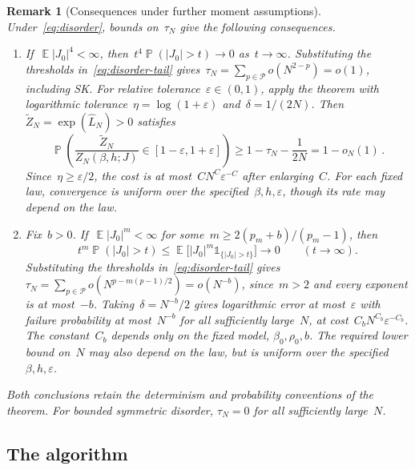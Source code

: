 \documentclass[letterpaper,11pt,reqno]{amsart}
\newenvironment{enumeratei}{\begin{enumerate}[\upshape (i)]}{\end{enumerate}}
\renewcommand{\leq}{\leqslant}
\renewcommand{\geq}{\geqslant}
\newcommand{\ind}{\mathds{1}}
\DeclareMathOperator{\E}{\mathds{E}}
\DeclareMathOperator{\pr}{\mathds{P}}
\newtheorem{remark}[theorem]{Remark}
\begin{document}
\begin{remark}[Consequences under further moment assumptions]\label{rem:moment-consequences}\label{thm:relative-counting}\label{cor:polynomial-confidence}
Under~\eqref{eq:disorder}, bounds on~$\tau_N$ give the following consequences.
\begin{enumeratei}
\item If~$\E|J_0|^4<\infty$, then~$t^4\pr(|J_0|>t)\to0$ as~$t\to\infty$. Substituting the thresholds in~\eqref{eq:disorder-tail} gives~$\tau_N=\sum_{p\in\mathcal P}o(N^{2-p})=o(1)$, including SK. For relative tolerance~$\varepsilon\in(0,1)$, apply the theorem with logarithmic tolerance~$\eta=\log(1+\varepsilon)$ and~$\delta=1/(2N)$. Then~$\widetilde Z_N=\exp(\widehat L_N)>0$ satisfies
\begin{equation}\label{eq:relative-counting-result}
\pr\left(\frac{\widetilde Z_N}{Z_N(\beta,h;J)}\in[1-\varepsilon,1+\varepsilon]\right)
\geq1-\tau_N-\frac1{2N}=1-o_N(1)\,.
\end{equation}
Since~$\eta\geq\varepsilon/2$, the cost is at most~$CN^C\varepsilon^{-C}$ after enlarging~$C$. For each fixed law, convergence is uniform over the specified~$\beta,h,\varepsilon$, though its rate may depend on the law.
\item Fix~$b>0$. If~$\E|J_0|^m<\infty$ for some~$m\geq2(p_m+b)/(p_m-1)$, then
\begin{equation*}
t^m\pr(|J_0|>t)\leq\E\bigl[|J_0|^m\ind_{\{|J_0|>t\}}\bigr]\longrightarrow0
\qquad(t\longrightarrow\infty).
\end{equation*}
Substituting the thresholds in~\eqref{eq:disorder-tail} gives~$\tau_N=\sum_{p\in\mathcal P}o(N^{p-m(p-1)/2})=o(N^{-b})$, since~$m>2$ and every exponent is at most~$-b$. Taking~$\delta=N^{-b}/2$ gives logarithmic error at most~$\varepsilon$ with failure probability at most~$N^{-b}$ for all sufficiently large~$N$, at cost~$C_bN^{C_b}\varepsilon^{-C_b}$. The constant~$C_b$ depends only on the fixed model, $\beta_0,\rho_0,b$. The required lower bound on~$N$ may also depend on the law, but is uniform over the specified~$\beta,h,\varepsilon$.
\end{enumeratei}
Both conclusions retain the determinism and probability conventions of the theorem. For bounded symmetric disorder, $\tau_N=0$ for all sufficiently large~$N$.
\end{remark}


\subsection{The algorithm}\label{subsec:algorithms}
\end{document}
